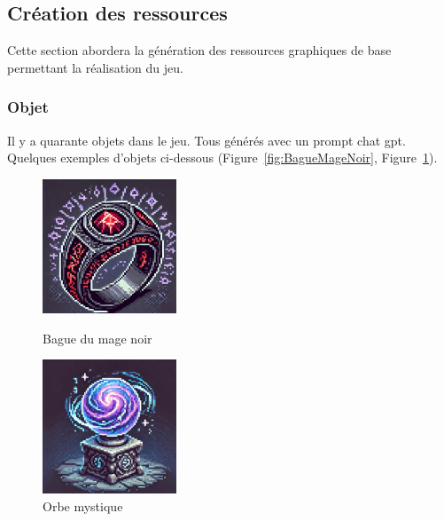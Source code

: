 \documentclass[11pt]{article}
\begin{document}
        \subsection{Création des ressources}
        Cette section abordera la génération des ressources graphiques de base permettant la réalisation du jeu.
            \subsubsection{Objet}
            Il y a quarante objets dans le jeu. Tous générés avec un prompt chat gpt.\\
            Quelques exemples d'objets ci-dessous (Figure~\ref{fig:BagueMageNoir}, Figure~\ref{fig:OrbeMystique}).
            \begin{figure}[H]
                \centering
                \begin{minipage}{0.45\textwidth}
                    \centering
                    \includegraphics[height=4cm]{Bague du mage noir.jpg}
                    \caption{Bague du mage noir}
                    \label{fig:BagueMageNoir}
                \end{minipage}
                \hfill
                \begin{minipage}{0.45\textwidth}
                    \centering
                    \includegraphics[height=4cm]{Orbe mystique.jpg}
                    \caption{Orbe mystique}
                    \label{fig:OrbeMystique}
                \end{minipage}
            \end{figure}
\end{document}
